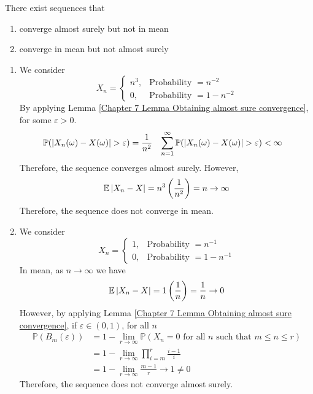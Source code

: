 \documentclass{huhtakm-template-book}
\newcommand{\prob}{\mathbb{P}}
\newcommand{\expect}{\mathbb{E}}
\begin{document}
\begin{lem}
    \label{Chapter 7 Lemma Non-relationship between almost surely convergence and mean}
    There exist sequences that
    \begin{enumerate}
        \item converge almost surely but not in mean
        \item converge in mean but not almost surely
    \end{enumerate}
\end{lem}
\begin{proofing}
    \begin{enumerate}
        \item We consider
        \begin{equation*}
            X_{n}=\begin{cases}
                n^{3}, &\text{Probability }=n^{-2}\\
                0, &\text{Probability }=1-n^{-2}
            \end{cases}
        \end{equation*}
        By applying Lemma \ref{Chapter 7 Lemma Obtaining almost sure convergence}, for some $\varepsilon>0$.
        \begin{align*}
            \prob(\abs{X_{n}(\omega)-X(\omega)}>\varepsilon)&=\frac{1}{n^{2}} & \sum_{n=1}^{\infty}\prob(\abs{X_{n}(\omega)-X(\omega)}>\varepsilon)&<\infty
        \end{align*}
        Therefore, the sequence converges almost surely. However,
        \begin{equation*}
            \expect\abs{X_{n}-X}=n^{3}\left(\frac{1}{n^{2}}\right)=n\to\infty
        \end{equation*}
        Therefore, the sequence does not converge in mean.
        \item We consider
        \begin{equation*}
            X_{n}=\begin{cases}
                1, &\text{Probability }=n^{-1}\\
                0, &\text{Probability }=1-n^{-1}
            \end{cases}
        \end{equation*}
        In mean, as $n\to\infty$ we have
        \begin{equation*}
            \expect\abs{X_{n}-X}=1\left(\frac{1}{n}\right)=\frac{1}{n}\to 0
        \end{equation*}
        However, by applying Lemma \ref{Chapter 7 Lemma Obtaining almost sure convergence}, if $\varepsilon\in(0,1)$, for all $n$
        \begin{align*}
            \prob(B_{m}(\varepsilon))&=1-\lim_{r\to\infty}\prob(X_{n}=0\text{ for all }n\text{ such that }m\leq n\leq r)\\
            &=1-\lim_{r\to\infty}\prod_{i=m}^{r}\frac{i-1}{i}\\
            &=1-\lim_{r\to\infty}\frac{m-1}{r}\to 1\neq 0
        \end{align*}
        Therefore, the sequence does not converge almost surely.
    \end{enumerate}
\end{proofing}
\end{document}
